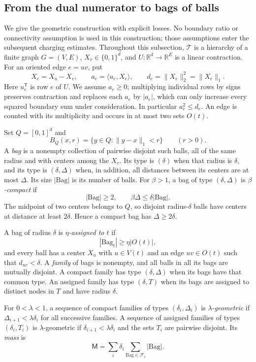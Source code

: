 \subsection{From the dual numerator to bags of balls}\label{hb:section}

We give the geometric construction with explicit losses.  No boundary
ratio or connectivity assumption is used in this construction; those
assumptions enter the subsequent charging estimates.  Throughout this
subsection, $\mathcal T$ is a hierarchy of a finite graph $G=(V,E)$,
$X_v\in\{0,1\}^d$, and $U:\mathbb R^d\to\mathbb R^E$ is a linear
contraction.  For an oriented edge $e=uv$, put
\[
 X_e=X_u-X_v,\qquad a_e=\langle u_e,X_e\rangle,\qquad
 d_e=\|X_e\|_2^2=\|X_e\|_1.
\]
Here $u_e^{\mathsf T}$ is row $e$ of $U$.  We assume $a_e\ge0$; multiplying individual
rows by signs preserves contraction and replaces each $a_e$ by $|a_e|$,
which can only increase every squared boundary sum under consideration.
In particular $a_e^2\le d_e$.  An edge is counted with its multiplicity
and occurs in at most two sets $O(t)$.

\begin{definition}\label{hb:definitions}
Set $Q=[0,1]^d$ and
\[
 B_Q(x,r)=\{y\in Q:\|y-x\|_1<r\}\qquad(r>0).
\]
A \emph{bag} is a nonempty collection of pairwise disjoint such balls,
all of the same radius and with centers among the $X_v$.  Its type is
$(\delta)$ when that radius is $\delta$, and its type is $(\delta,\Delta)$
when, in addition, all distances between its centers are at most
$\Delta$.  Its size $|\mathrm{Bag}|$ is its number of balls.
For $\beta>1$, a bag of type $(\delta,\Delta)$ is
\emph{$\beta$-compact} if
\[
 |\mathrm{Bag}|\ge2,\qquad
 \beta\Delta\le\delta|\mathrm{Bag}|.
\]
The midpoint of two centers belongs to $Q$, so disjoint radius-$\delta$
balls have centers at distance at least $2\delta$.  Hence a compact bag
has $\Delta\ge2\delta$.

A bag of radius $\delta$ is \emph{$\eta$-assigned to $t$} if
\[
 |\mathrm{Bag}_t|\ge\eta|O(t)|,
\]
and every ball has a center $X_u$ with $u\in V(t)$ and an edge
$uv\in O(t)$ such that $d_{uv}<\delta$.  A \emph{family} of bags is
nonempty, and all balls in all its bags are mutually disjoint.
A compact family has type $(\delta,\Delta)$ when its bags have that
common type.  An assigned family has type $(\delta,T)$ when its bags
are assigned to distinct nodes in $T$ and have radius $\delta$.

For $0<\lambda<1$, a sequence of compact families of types
$(\delta_i,\Delta_i)$ is \emph{$\lambda$-geometric} if
$\Delta_{i+1}<\lambda\delta_i$ for all successive families.
A sequence of assigned families of types $(\delta_i,T_i)$ is
$\lambda$-geometric if $\delta_{i+1}<\lambda\delta_i$ and the sets
$T_i$ are pairwise disjoint.  Its \emph{mass} is
\[
 \mathsf M=\sum_i\delta_i
       \sum_{\mathrm{Bag}\in\mathcal F_i}|\mathrm{Bag}|.
\]
\end{definition}

